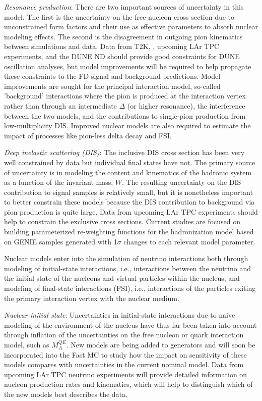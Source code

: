   \emph{Resonance production}:
  There are two important sources of uncertainty in this model. The first is the uncertainty on the free-nucleon
  cross section due to unconstrained form factors and their use as effective parameters to absorb nuclear
  modeling effects.
  The second is the disagreement in outgoing pion kinematics between simulations and data.
  Data from T2K, \minerva, upcoming LAr TPC experiments, and the DUNE ND should provide good constraints for DUNE
  oscillation analyses, but model improvements will be required to help propagate these constraints
  to the FD signal and background predictions. Model improvements are sought for the principal interaction
  model, so-called 'background' interactions where the pion is produced at the interaction vertex
  rather than through an intermediate $\Delta$ (or higher resonance), the interference between the two
  models, and the contributions to single-pion production from low-multiplicity DIS. Improved nuclear models
  are also required to estimate the impact of processes like pion-less delta decay and FSI.

  \emph{Deep inelastic scattering (DIS)}: The inclusive DIS cross section has been very well constrained by 
  data but individual final states have not. The primary source of uncertainty is in modeling the
  content and kinematics of the hadronic system as a function of the invariant mass, $W$. The resulting
  uncertainty on the DIS contribution to signal samples is relatively small, but it is nonetheless important
  to better constrain these models because the DIS contribution to background via pion production is quite large.
  Data from upcoming LAr TPC experiments should help to constrain
  the exclusive cross sections. Current studies are focused on building parameterized re-weighting 
  functions for the hadronization model based on GENIE samples generated with 1$\sigma$ changes to each relevant 
  model parameter.

Nuclear models enter into the simulation of neutrino interactions both through modeling of initial-state interactions,
i.e., interactions between the neutrino and the initial state of the nucleons and virtual particles within the nucleus,
and modeling of final-state interactions (FSI), i.e., interactions of the particles exiting the
primary interaction vertex with the nuclear medium. 

  \emph{Nuclear initial state}: Uncertainties in initial-state interactions due to
  naive modeling of the environment of the nucleus have thus far been taken into account through inflation
  of the uncertainties on the free nucleon or quark interaction
  model, such as $M_{A}^{QE}$. New models are being added to generators and will soon be incorporated into the Fast MC
  to study how the impact on sensitivity of these models compares with uncertainties in the current nominal model.
  Data from upcoming LAr TPC neutrino experiments will provide detailed information on nucleon production
  rates and kinematics, which will help to distinguish which of the new models best describes the data.

